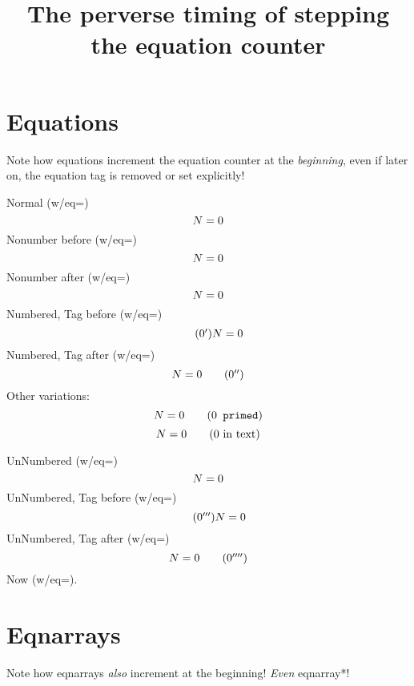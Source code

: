 \documentclass{article}
\title{The perverse timing of stepping the equation counter}
\begin{document}
\maketitle
\section{Equations}
Note how equations increment the equation counter at the \emph{beginning},
even if later on, the equation tag is removed or set explicitly!

Normal (w/eq=\theequation)
\begin{equation}
N=\mbox{\theequation}
\end{equation}
Nonumber before (w/eq=\theequation)
\begin{equation}
\nonumber
N=\mbox{\theequation}
\end{equation}
Nonumber after (w/eq=\theequation)
\begin{equation}
N=\mbox{\theequation}
\nonumber
\end{equation}
Numbered, Tag before (w/eq=\theequation)
\begin{equation}
\tag{\theequation$'$}
N=\mbox{\theequation}
\end{equation}
Numbered, Tag after (w/eq=\theequation)
\begin{equation}
N=\mbox{\theequation}
\tag{\theequation$''$}
\end{equation}
Other variations:
\begin{equation}
N=\mbox{\theequation}
\tag{\theequation\texttt{ primed}}
\end{equation}
\begin{equation}
N=\mbox{\theequation}
\tag{\theequation\ifmmode~in math\else~in text\fi}
\end{equation}

UnNumbered (w/eq=\theequation)
\begin{equation*}
N=\mbox{\theequation}
\end{equation*}
UnNumbered, Tag before (w/eq=\theequation)
\begin{equation*}
\tag{\theequation$'''$}
N=\mbox{\theequation}
\end{equation*}
UnNumbered, Tag after (w/eq=\theequation)
\begin{equation*}
N=\mbox{\theequation}
\tag{\theequation$''''$}
\end{equation*}
Now (w/eq=\theequation).

\section{Eqnarrays}
Note how eqnarrays \emph{also} increment at the beginning!
\emph{Even} eqnarray*!
\end{document}
